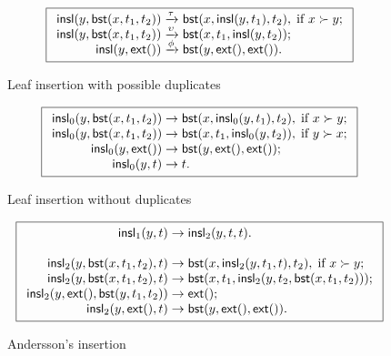 \bigskip

\begin{figure}[h]
\begin{equation*}
\boxed{
\begin{array}{r@{\;}l@{\;}l}
\fun{insl}(y,\fun{bst}(x,t_1,t_2)) & \xrightarrow{\smash{\tau}} &
  \fun{bst}(x,\fun{insl}(y,t_1),t_2), \; \text{if \(x \succ y\)};\\
\fun{insl}(y,\fun{bst}(x,t_1,t_2)) & \xrightarrow{\smash{\upsilon}} &
  \fun{bst}(x,t_1,\fun{insl}(y,t_2));\\
\fun{insl}(y,\fun{ext}()) & \xrightarrow{\smash{\phi}} & \fun{bst}(y,\fun{ext}(),\fun{ext}()).
\end{array}}
\end{equation*}
\caption{Leaf insertion with possible duplicates\label{fig:insl}}
\end{figure}

\bigskip

\begin{figure}[h]
\begin{equation*}
\boxed{
\begin{array}{r@{\;}l@{\;}l}
\fun{insl}_0(y,\fun{bst}(x,t_1,t_2)) & \rightarrow &
  \fun{bst}(x,\fun{insl}_0(y,t_1),t_2), \; \text{if \(x \succ y\)};\\
\fun{insl}_0(y,\fun{bst}(x,t_1,t_2)) & \rightarrow &
  \fun{bst}(x,t_1,\fun{insl}_0(y,t_2)) , \; \text{if \(y \succ x\)};\\
\fun{insl}_0(y,\fun{ext}()) & \rightarrow &
\fun{bst}(y,\fun{ext}(),\fun{ext}());\\
\fun{insl}_0(y,t) & \rightarrow & t.
\end{array}}
\end{equation*}
\caption{Leaf insertion without duplicates\label{fig:insl0}}
\end{figure}

\bigskip

\begin{figure}[h]
\begin{equation*}
\boxed{
\begin{array}{r@{\;}l@{\;}l}
\fun{insl}_1(y,t) & \rightarrow & \fun{insl}_2(y,t,t).\\
\\
\fun{insl}_2(y,\fun{bst}(x,t_1,t_2),t) & \rightarrow &
  \fun{bst}(x,\fun{insl}_2(y,t_1,t),t_2), \; \text{if \(x \succ y\)};\\
\fun{insl}_2(y,\fun{bst}(x,t_1,t_2),t) & \rightarrow &
  \fun{bst}(x,t_1,\fun{insl}_2(y,t_2,\fun{bst}(x,t_1,t_2)));\\
\fun{insl}_2(y,\fun{ext}(),\fun{bst}(y,t_1,t_2)) & \rightarrow & \fun{ext}();\\
\fun{insl}_2(y,\fun{ext}(),t) & \rightarrow & \fun{bst}(y,\fun{ext}(),\fun{ext}()).
\end{array}}
\end{equation*}
\caption{Andersson's insertion\label{fig:insl1}}
\end{figure}

